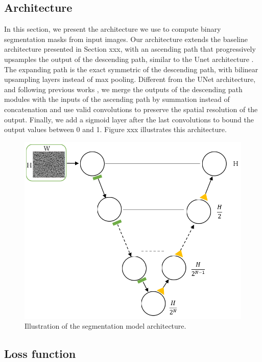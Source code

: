 \documentclass[10pt,twocolumn,letterpaper]{article}
\begin{document}
\subsection{Architecture}
% 
In this section, we present the architecture we use 
to compute binary segmentation masks from input images.
Our architecture extends the baseline architecture presented in Section xxx,
with an ascending path that progressively upsamples the output
of the descending path, similar to the Unet architecture \cite{}.
The expanding path is the exact symmetric of the descending path,
with bilinear upsampling layers instead of max pooling.
Different from the UNet architecture, and following previous works \cite{},
we merge the outputs of the descending path modules with the inputs of the ascending path 
by summation instead of concatenation and use valid convolutions 
to preserve the spatial resolution of the output.
Finally, we add a sigmoid layer after the last convolutions to bound the output values between 0 and 1.
Figure xxx illustrates this architecture.

\begin{figure}[h]
	\centering
	\includegraphics[width=0.9\linewidth]{"./figures/Figure6"}
	\caption{
		Illustration of the segmentation model architecture.
	}
\end{figure}

\subsection{Loss function}
\end{document}
